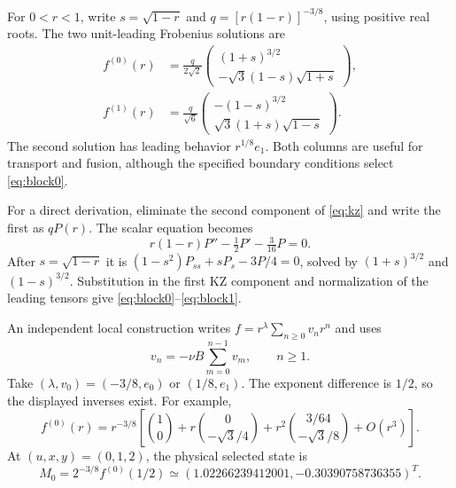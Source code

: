 For $0<r<1$, write $s=\sqrt{1-r}$ and $q=[r(1-r)]^{-3/8}$, using positive
real roots. The two unit-leading Frobenius solutions are
\begin{align}
 f^{(0)}(r)&=\frac{q}{2\sqrt2}
 \begin{pmatrix}(1+s)^{3/2}\\-\sqrt3(1-s)\sqrt{1+s}\end{pmatrix},
 \label{eq:block0}\\
 f^{(1)}(r)&=\frac{q}{\sqrt6}
 \begin{pmatrix}-(1-s)^{3/2}\\\sqrt3(1+s)\sqrt{1-s}\end{pmatrix}.
 \label{eq:block1}
\end{align}
The second solution has leading behavior $r^{1/8}e_1$. Both columns are
useful for transport and fusion, although the specified boundary conditions
select \eqref{eq:block0}.

For a direct derivation, eliminate the second component of \eqref{eq:kz}
and write the first as $qP(r)$. The scalar equation becomes
\begin{equation}
 r(1-r)P''-\tfrac12P'-\tfrac3{16}P=0.
\end{equation}
After $s=\sqrt{1-r}$ it is
$(1-s^2)P_{ss}+sP_s-3P/4=0$, solved by $(1+s)^{3/2}$ and
$(1-s)^{3/2}$. Substitution in the first KZ component and normalization of
the leading tensors give \eqref{eq:block0}--\eqref{eq:block1}.

An independent local construction writes
$f=r^\lambda\sum_{n\ge0}v_nr^n$ and uses
\begin{equation}
 [(\lambda+n)I-\nu D]v_n
 =-\nu B\sum_{m=0}^{n-1}v_m,\qquad n\ge1.
 \label{eq:recurrence}
\end{equation}
Take $(\lambda,v_0)=(-3/8,e_0)$ or $(1/8,e_1)$. The exponent difference
is $1/2$, so the displayed inverses exist. For example,
\begin{equation}
 f^{(0)}(r)=r^{-3/8}\left[
 \binom10+r\binom0{-\sqrt3/4}
 +r^2\binom{3/64}{-\sqrt3/8}+O(r^3)\right].
\end{equation}
At $(u,x,y)=(0,1,2)$, the physical selected state is
\begin{equation}
 M_0=2^{-3/8}f^{(0)}(1/2)
 \simeq (1.02266239412001,-0.30390758736355)^T.
 \label{eq:selected_initial}
\end{equation}
